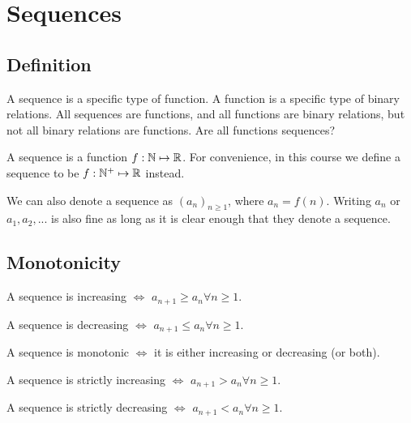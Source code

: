 \chapter{Sequences}


\section{Definition}
A sequence is a specific type of function. A function is a specific type of binary relations. All sequences are functions, and all functions are binary relations, but not all binary relations are functions. Are all functions sequences?
\begin{definition}
  A sequence is a function $f:\mathbb{N}\mapsto\mathbb{R}$. For convenience, in this course we define a sequence to be $f:\mathbb{N}^+\mapsto\mathbb{R}$ instead.
\end{definition}
\begin{notation}
  We can also denote a sequence as $(a_n)_{n\geq 1}$, where $a_n = f(n)$. Writing $a_n$ or $a_1, a_2, ...$ is also fine as long as it is clear enough that they denote a sequence.
\end{notation}


\section{Monotonicity}
\begin{definition}
  A sequence is increasing $\iff$ $a_{n+1}\geq a_n\forall n\geq 1$.
\end{definition}
\begin{definition}
  A sequence is decreasing $\iff$ $a_{n+1}\leq a_n\forall n\geq 1$.
\end{definition}
\begin{definition}
  A sequence is monotonic $\iff$ it is either increasing or decreasing (or both).
\end{definition}
\begin{definition}
  A sequence is strictly increasing $\iff$ $a_{n+1}>a_n\forall n\geq 1$.
\end{definition}
\begin{definition}
  A sequence is strictly decreasing $\iff$ $a_{n+1}<a_n\forall n\geq 1$.
\end{definition}

